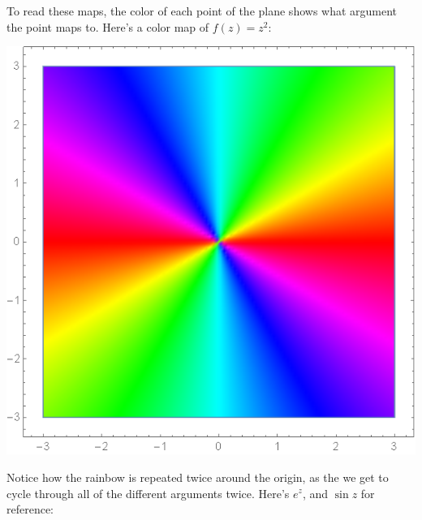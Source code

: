 To read these maps, the color of each point of the plane shows what argument the point maps to. Here's a color map of $f(z) = z^2$:
\begin{center}
    \includegraphics[scale=0.27]{images/colorzsqr.png}
\end{center}
Notice how the rainbow is repeated twice around the origin, as the we get to cycle through all of the different arguments twice. Here's $e^z$, and $\sin z$ for reference:
